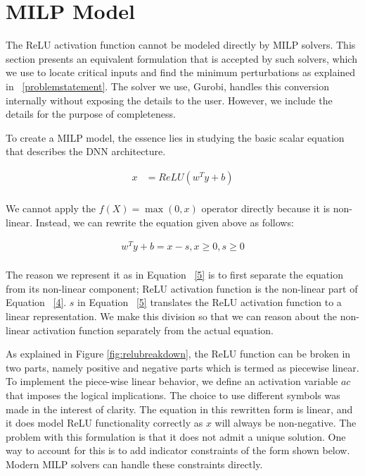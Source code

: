 \section{MILP Model}
The ReLU activation function cannot be modeled directly by MILP solvers. 
This section presents an
equivalent formulation that is accepted by such solvers, which we use to locate critical inputs and find the minimum perturbations as explained in ~\ref{problemstatement}. 
The solver we use, Gurobi, handles this conversion
internally without exposing the details to the user. 
However, we include the details for the purpose of completeness.

 To create a \ac{MILP} model, the essence lies in studying the basic scalar equation that describes the \ac{DNN} architecture. 

\begin{equation}
\label{4}
\begin{aligned}
x &= ReLU(w^Ty + b) \\
\end{aligned}
\end{equation}
 

We cannot apply the $f(X) = \max(0, x)$ operator directly because it is non-linear. 
Instead, we can rewrite the equation given above as follows:

\begin{equation}
\label{5}
\begin{aligned}
w^Ty + b = x - s, x \geq 0, s \geq 0 \\
\end{aligned}
\end{equation}

The reason we represent it as in Equation ~\ref{5} is to first separate the equation from its non-linear component;  ReLU activation function is the non-linear part of Equation ~\ref{4}.
$s$ in Equation ~\ref{5} translates the ReLU activation function to a linear representation. 
We make this division so that we can reason about the non-linear activation function separately from the actual equation. 

As explained in Figure \ref{fig:relubreakdown}, the ReLU function can be broken in two parts, namely positive and negative parts which is termed as piecewise linear.  
To implement the piece-wise linear behavior, we define an activation variable $ac$ that imposes the logical implications. 
The choice to use different symbols was made in the interest of clarity. The equation in this rewritten form is linear, and it does model ReLU functionality  correctly as $x$ will always be non-negative. 
The problem with this formulation is that it does not admit a unique solution. One way to account for this is to add indicator constraints of the form shown below. 
Modern MILP solvers can handle these constraints directly.

